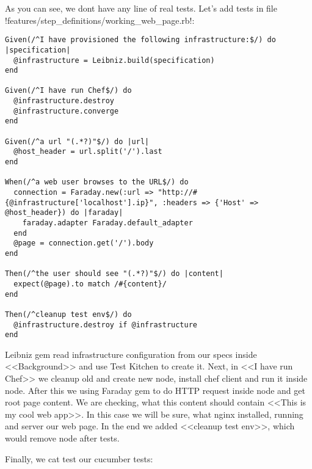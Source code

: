 As you can see, we dont have any line of real tests. Let's add tests in file \inline!features/step_definitions/working_web_page.rb!:

\begin{lstlisting}[label=lst:testing-cucumber-spec6]
Given(/^I have provisioned the following infrastructure:$/) do |specification|
  @infrastructure = Leibniz.build(specification)
end

Given(/^I have run Chef$/) do
  @infrastructure.destroy
  @infrastructure.converge
end

Given(/^a url "(.*?)"$/) do |url|
  @host_header = url.split('/').last
end

When(/^a web user browses to the URL$/) do
  connection = Faraday.new(:url => "http://#{@infrastructure['localhost'].ip}", :headers => {'Host' => @host_header}) do |faraday|
    faraday.adapter Faraday.default_adapter
  end
  @page = connection.get('/').body
end

Then(/^the user should see "(.*?)"$/) do |content|
  expect(@page).to match /#{content}/
end

Then(/^cleanup test env$/) do
  @infrastructure.destroy if @infrastructure
end
\end{lstlisting}

Leibniz gem read infrastructure configuration from our specs inside <<Background>> and use Test Kitchen to create it. Next, in <<I have run Chef>> we cleanup old and create new node, install chef client and run it inside node. After this we using Faraday gem to do HTTP request inside node and get root page content. We are checking, what this content should contain <<This is my cool web app>>. In this case we will be sure, what nginx installed, running and server our web page. In the end we added <<cleanup test env>>, which would remove node after tests.

Finally, we cat test our cucumber tests:

